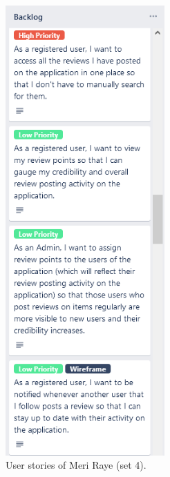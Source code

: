 \documentclass[11pt]{extarticle}
\begin{document}
\begin{center}
    \begin{figure}[H]
        \centering
        \includegraphics[width=2.4in]{Figures/user_stories_4.png}
        \caption{User stories of Meri Raye (set 4).}
    \end{figure}
\end{center}
\end{document}
